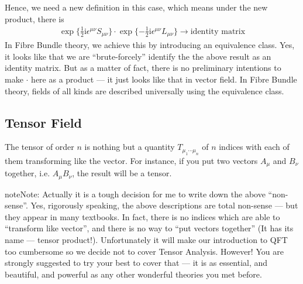 \documentclass[letterpaper,10pt,english]{sphinxmanual}
\begin{document}
Hence, we need a new definition in this case, which means under the new product, there is
\begin{equation*}
\begin{split}\exp\{\frac{1}{2}\mathrm{i}\epsilon^{\mu\nu}S_{\mu\nu}\} \cdot \exp\{-\frac{1}{2}\mathrm{i}\epsilon^{\mu\nu}L_{\mu\nu}\} \rightarrow \text{identity matrix}\end{split}
\end{equation*}
In Fibre Bundle theory, we achieve this by introducing an equivalence class. Yes, it looks like that we are ``brute-forcely'' identify the the above result as an identity matrix. But as a matter of fact, there is no preliminary intentions to make \(\cdot\) here as a product --- it just looks like that in vector field. In Fibre Bundle theory, fields of all kinds are described universally using the equivalence class.


\subsection{Tensor Field}
\label{\detokenize{field:tensor-field}}
The tensor of order \(n\) is nothing but a quantity \(T_{\mu_1\cdots \mu_n}\) of \(n\) indices with each of them transforming like the vector. For instance, if you put two vectors \(A_\mu\) and \(B_\nu\) together, i.e. \(A_\mu B_\nu\), the result will be a tensor.

\begin{sphinxadmonition}{note}{Note:}
Actually it is a tough decision for me to write down the above ``non-sense''. Yes, rigorously speaking, the above descriptions are total non-sense --- but they appear in many textbooks. In fact, there is no indices which are able to ``transform like vector'', and there is no way to ``put vectors together'' (It has its name --- tensor product!). Unfortunately it will make our introduction to QFT too cumbersome so we decide not to cover Tensor Analysis. However! You are strongly suggested to try your best to cover that --- it is as essential, and beautiful, and powerful as any other wonderful theories you met before.
\end{sphinxadmonition}
\end{document}
